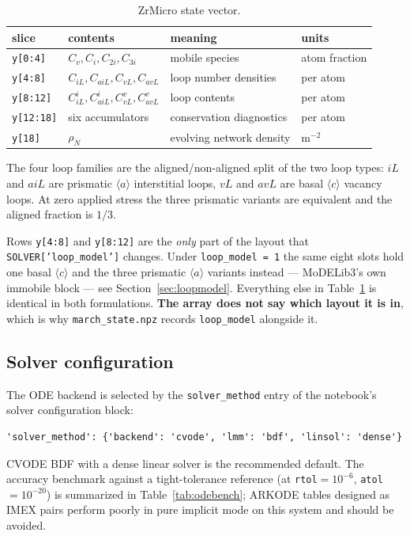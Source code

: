 \documentclass[11pt]{article}
\newcommand{\aloop}{\ensuremath{\langle a\rangle}}
\newcommand{\cloop}{\ensuremath{\langle c\rangle}}
\newcommand{\ZrM}{\textsf{ZrMicro}}
\newcommand{\MoD}{\textsf{MoDELib3}}
\newcommand{\code}[1]{\texttt{\small #1}}
\newcommand{\file}[1]{\texttt{\footnotesize #1}}
\begin{document}
\begin{table}[htbp]
\centering
\caption{\ZrM{} state vector.}
\label{tab:state0d}
\begin{tabular}{@{}llll@{}}
\toprule
slice & contents & meaning & units \\
\midrule
\code{y[0:4]}  & $C_v, C_i, C_{2i}, C_{3i}$ & mobile species & atom fraction \\
\code{y[4:8]}  & $C_{iL}, C_{aiL}, C_{vL}, C_{avL}$ & loop number densities & per atom \\
\code{y[8:12]} & $C_{iL}^{i}, C_{aiL}^{i}, C_{vL}^{v}, C_{avL}^{v}$ & loop contents & per atom \\
\code{y[12:18]} & six accumulators & conservation diagnostics & per atom \\
\code{y[18]}   & $\rho_N$ & evolving network density & m$^{-2}$ \\
\bottomrule
\end{tabular}
\end{table}

The four loop families are the aligned/non-aligned split of the two loop
types: $iL$ and $aiL$ are prismatic \aloop{} interstitial loops, $vL$ and
$avL$ are basal \cloop{} vacancy loops. At zero applied stress the three
prismatic variants are equivalent and the aligned fraction is $1/3$.

Rows \code{y[4:8]} and \code{y[8:12]} are the \emph{only} part of the layout
that \code{SOLVER['loop\_model']} changes. Under \code{loop\_model = 1} the
same eight slots hold one basal \cloop{} and the three prismatic \aloop{}
variants instead --- \MoD{}'s own immobile block ---
see Section~\ref{sec:loopmodel}. Everything else in Table~\ref{tab:state0d} is
identical in both formulations. \textbf{The array does not say which layout it
is in}, which is why \file{march\_state.npz} records \code{loop\_model}
alongside it.

\subsection{Solver configuration}
\label{sec:solvercfg}

The ODE backend is selected by the \code{solver\_method} entry of the
notebook's solver configuration block:

\begin{lstlisting}[style=py]
'solver_method': {'backend': 'cvode', 'lmm': 'bdf', 'linsol': 'dense'}
\end{lstlisting}

CVODE BDF with a dense linear solver is the recommended default. The
accuracy benchmark against a tight-tolerance reference (at
\code{rtol}$=10^{-6}$, \code{atol}$=10^{-20}$) is summarized in
Table~\ref{tab:odebench}; ARKODE tables designed as IMEX pairs perform
poorly in pure implicit mode on this system and should be avoided.
\end{document}
